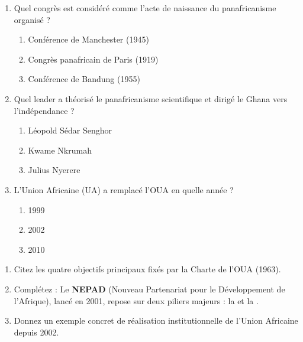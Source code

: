 \documentclass[11pt]{article}
\begin{document}
\begin{exercice}
\begin{enumerate}
    \item Quel congrès est considéré comme l'acte de naissance du panafricanisme organisé ?
    \begin{enumerate}
        \item Conférence de Manchester (1945)
        \item Congrès panafricain de Paris (1919)
        \item Conférence de Bandung (1955)
    \end{enumerate}
    \item Quel leader a théorisé le \og panafricanisme scientifique \fg et dirigé le Ghana vers l'indépendance ?
    \begin{enumerate}
        \item Léopold Sédar Senghor
        \item Kwame Nkrumah
        \item Julius Nyerere
    \end{enumerate}
    \item L'Union Africaine (UA) a remplacé l'OUA en quelle année ?
    \begin{enumerate}
        \item 1999
        \item 2002
        \item 2010
    \end{enumerate}
\end{enumerate}
\end{exercice}

\begin{exercice}
\begin{enumerate}
    \item Citez les quatre objectifs principaux fixés par la Charte de l'OUA (1963).
    \item Complétez : Le \textbf{NEPAD} (Nouveau Partenariat pour le Développement de l'Afrique), lancé en 2001, repose sur deux piliers majeurs : la \underline{\hspace{4cm}} et la \underline{\hspace{4cm}}.
    \item Donnez un exemple concret de réalisation institutionnelle de l'Union Africaine depuis 2002.
\end{enumerate}
\end{exercice}
\end{document}
